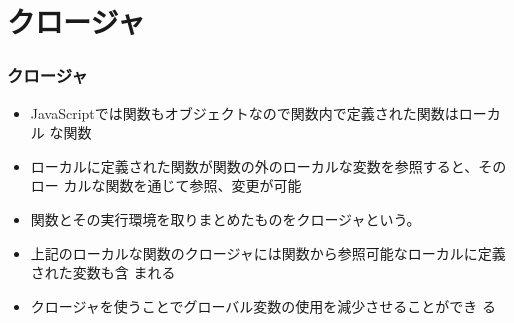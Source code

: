 

\frame{\maketitle}
\section{クロージャ}
\begin{frame}[containsverbatim]
 \frametitle{クロージャ}
\begin{itemize}
	 \item  JavaScriptでは関数もオブジェクトなので関数内で定義された関数はローカル
 な関数
	 \item ローカルに定義された関数が関数の外のローカルな変数を参照すると、そのロー
				 カルな関数を通じて参照、変更が可能
 \item 関数とその実行環境を取りまとめたものをクロージャという。
 \item 上記のローカルな関数のクロージャには関数から参照可能なローカルに定義された変数も含
			 まれる
 \item クロージャを使うことでグローバル変数の使用を減少させることができ
			 る
	\end{itemize}
\end{frame}

